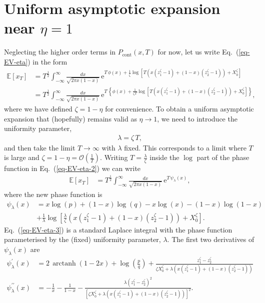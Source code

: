 \documentclass[11pt]{article}
\DeclareMathOperator\arctanh{arctanh}
\begin{document}
\section{Uniform asymptotic expansion near $\eta = 1$}

Neglecting the higher order terms in $P_\text{cont}(x,T)$ for now, let us write Eq.~(\ref{eq-EV-eta}) in the form
\begin{align}
\nonumber \mathbb{E}\left[x_T \right] & 
= T^\frac{1}{2}  \int_{-\infty}^\infty \frac{dx}{\sqrt{2 \pi x (1-x)}} \,\mathrm{e}^{T\,\phi(x)+ \frac{1}{\zeta}\log\left[T \left( x (z_1^\zeta - 1) + (1-x) (z_2^\zeta -1) \right) + X_0^{\zeta} \right]}\\
  \label{eq-EV-eta-2}  &= T^\frac{1}{2}  \int_{-\infty}^\infty \frac{dx}{\sqrt{2 \pi x (1-x)}} \,\mathrm{e}^{T\, \left\{\phi(x)+ \frac{1}{\zeta T}\log\left[T \left( x (z_1^\zeta - 1) + (1-x) (z_2^\zeta -1) \right) + X_0^{\zeta} \right]\right\}},
\end{align} 
where we have defined $\zeta = 1 - \eta$ for convenience.
To obtain a uniform asymptotic expansion that (hopefully) remains valid as $\eta \to 1$, we need to introduce the uniformity parameter,
\begin{align}
\label{eq-uniformity-parameter}
\lambda = \zeta \,T,
\end{align}
and then take the limit $T\to\infty$ with $\lambda$ fixed.  This corresponds to a limit where $T$ is large and $\zeta = 1-\eta = \mathcal{O}\left(\frac{1}{T}\right)$. Writing $T=\frac{\lambda}{\zeta}$ inside the $\log$ part of the phase function in Eq.~(\ref{eq-EV-eta-2}) we can write
\begin{align}
  \label{eq-EV-eta-3}  \mathbb{E}\left[x_T \right] & = T^\frac{1}{2}  \int_{-\infty}^\infty \frac{dx}{\sqrt{2 \pi x (1-x)}} \,\mathrm{e}^{T\,\psi_\lambda(x)},
\end{align}
where the new phase function is
\begin{align}
\nonumber \psi_\lambda(x) &=    x \log(p) +  (1 - x) \log (q)  - x \log(x) -  (1 - x) \log(1 - x) \\
\label{eq-psi_lambda} &+  \frac{1}{\lambda}\log\left[\frac{\lambda}{\zeta} \left( x (z_1^\zeta - 1) + (1-x) (z_2^\zeta -1) \right) + X_0^{\zeta} \right].
\end{align}
Eq.~(\ref{eq-EV-eta-3}) is a standard Laplace integral with the phase function parameterised by the (fixed) uniformity parameter, $\lambda$.
The first two derivatives of $\psi_\lambda(x)$ are
\begin{align}
\psi_\lambda^\prime(x) & = 2\, \arctanh(1-2 x) + \log\left(\frac{p}{q}\right) + \frac{z_1^\zeta - z_2^\zeta}{\zeta X_0^\zeta + \lambda\left( x (z_1^\zeta -1) + (1-x)(z_2^\zeta - 1)\right)} \\
\psi_\lambda^{\prime\prime}(x) & = -\frac{1}{x} -\frac{1}{1-x} -  \frac{\lambda(z_1^\zeta - z_2^\zeta)^2}{\left[ \zeta X_0^\zeta + \lambda\left( x (z_1^\zeta -1) + (1-x)(z_2^\zeta - 1)\right)\right]^2}. 
\end{align}
\end{document}
